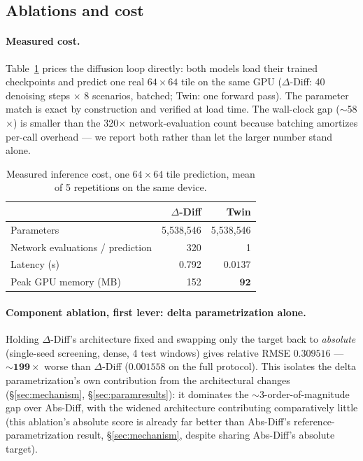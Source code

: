 \documentclass[11pt]{article}
\newcommand{\ours}{\mbox{$\Delta$-Diff}}
\newcommand{\absdiff}{\mbox{Abs-Diff}}
\newcommand{\twin}{\mbox{Twin}}
\begin{document}
\subsection{Ablations and cost}
\label{sec:ablations}

\paragraph{Measured cost.} Table~\ref{tab:cost} prices the diffusion loop
directly: both models load their trained checkpoints and predict one real
$64\times64$ tile on the same GPU (\ours{}: 40 denoising steps $\times$ 8
scenarios, batched; \twin{}: one forward pass). The parameter match is
exact by construction and verified at load time. The wall-clock gap
($\sim$58$\times$) is smaller than the 320$\times$ network-evaluation
count because batching amortizes per-call overhead --- we report both
rather than let the larger number stand alone.

\begin{table}[H]
\centering
\caption{Measured inference cost, one $64\times64$ tile prediction,
mean of 5 repetitions on the same device.}
\label{tab:cost}
\begin{tabular}{lrr}
\toprule
 & \ours{} & \twin{} \\
\midrule
Parameters & 5{,}538{,}546 & 5{,}538{,}546 \\
Network evaluations / prediction & 320 & 1 \\
Latency (s) & 0.792 & $\mathbf{0.0137}$ \\
Peak GPU memory (MB) & 152 & $\mathbf{92}$ \\
\bottomrule
\end{tabular}
\end{table}

\paragraph{Component ablation, first lever: delta parametrization alone.}
Holding \ours{}'s architecture fixed and swapping only the target back to
\emph{absolute} (single-seed screening, dense, 4 test windows) gives
relative RMSE $0.309516$ --- $\mathbf{\sim199\times}$ worse than \ours{}
($0.001558$ on the full protocol). This isolates the delta
parametrization's own contribution from the architectural changes
(\S\ref{sec:mechanism}, \S\ref{sec:paramresults}): it dominates the
$\sim$3-order-of-magnitude gap over \absdiff{}, with the widened
architecture contributing comparatively little (this ablation's absolute
score is already far better than \absdiff{}'s reference-parametrization
result, \S\ref{sec:mechanism}, despite sharing \absdiff{}'s absolute
target).
\end{document}
